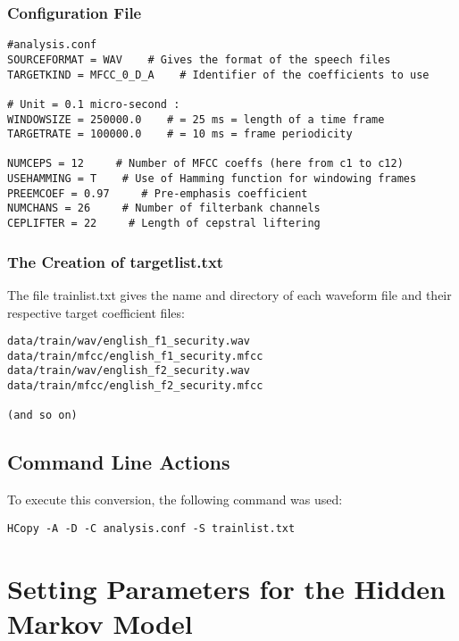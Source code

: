\documentclass{wileySev}
\begin{document}
\subsection{Configuration File}
\begin{verbatim}
#analysis.conf
SOURCEFORMAT = WAV    # Gives the format of the speech files
TARGETKIND = MFCC_0_D_A    # Identifier of the coefficients to use

# Unit = 0.1 micro-second :
WINDOWSIZE = 250000.0    # = 25 ms = length of a time frame
TARGETRATE = 100000.0    # = 10 ms = frame periodicity

NUMCEPS = 12     # Number of MFCC coeffs (here from c1 to c12)
USEHAMMING = T    # Use of Hamming function for windowing frames
PREEMCOEF = 0.97     # Pre-emphasis coefficient
NUMCHANS = 26     # Number of filterbank channels
CEPLIFTER = 22     # Length of cepstral liftering
\end{verbatim}

\subsection{The Creation of targetlist.txt}

The file trainlist.txt gives the name and directory of each waveform file and their respective target coefficient files:
\begin{verbatim}
data/train/wav/english_f1_security.wav data/train/mfcc/english_f1_security.mfcc
data/train/wav/english_f2_security.wav data/train/mfcc/english_f2_security.mfcc

(and so on)
\end{verbatim}

\section{Command Line Actions}
To execute this conversion, the following command was used:
\begin{verbatim}
HCopy -A -D -C analysis.conf -S trainlist.txt
\end{verbatim}

\chapter{Setting Parameters for the Hidden Markov Model}
\end{document}
